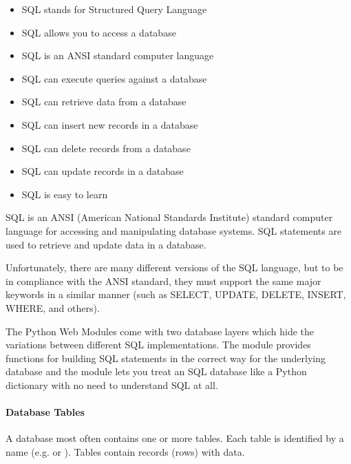 \documentclass{howto}
\begin{document}
\begin{itemize}
\item 
SQL stands for Structured Query Language
\item 
SQL allows you to access a database
\item 
SQL is an ANSI standard computer language
\item 
SQL can execute queries against a database
\item 
SQL can retrieve data from a database
\item 
SQL can insert new records in a database
\item 
SQL can delete records from a database
\item 
SQL can update records in a database
\item 
SQL is easy to learn
\end{itemize}

SQL is an ANSI (American National Standards Institute) standard computer language for accessing and manipulating database systems. SQL statements are used to retrieve and update data in a database. 

Unfortunately, there are many different versions of the SQL language, but to be in compliance with the ANSI standard, they must support the same major keywords in a similar manner (such as SELECT, UPDATE, DELETE, INSERT, WHERE, and others). 


\begin{seealso}
    {The Python Web Modules come with two database layers which hide the variations between different SQL implementations. The  module provides functions for building SQL statements in the correct way for the underlying database and the  module lets you treat an SQL database like a Python dictionary with no need to understand SQL at all.}
\end{seealso}

\paragraph{Database Tables}

A database most often contains one or more tables. Each table is identified by a name (e.g.  or ). Tables contain records (rows) with data.
\end{document}
